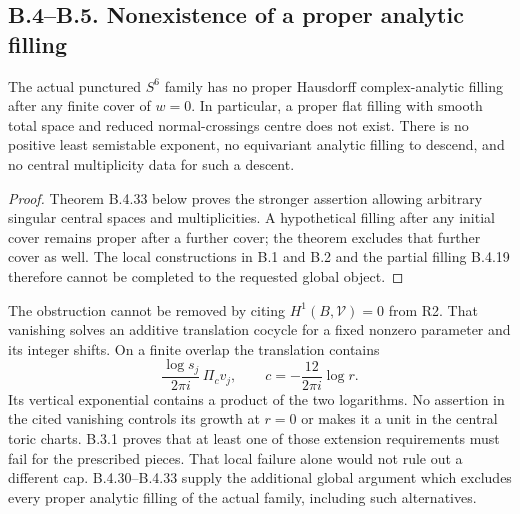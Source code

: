 

\subsection{B.4--B.5. Nonexistence of a proper analytic filling}

\begin{corollary}\label{push:B41}
The actual punctured $S^6$ family has no proper
Hausdorff complex-analytic filling after any finite
cover of $w=0$. In particular, a proper flat filling
with smooth total space and reduced normal-crossings
centre does not exist. There is no positive least
semistable exponent, no equivariant analytic filling
to descend, and no central multiplicity data for
such a descent.
\end{corollary}
\begin{proof}
Theorem B.4.33 below proves the stronger assertion
allowing arbitrary singular central spaces and
multiplicities. A hypothetical filling after any
initial cover remains proper after a further cover;
the theorem excludes that further cover as well.
The local constructions in B.1 and B.2 and the
partial filling B.4.19 therefore cannot be completed
to the requested global object.
\end{proof}

The obstruction cannot be removed by citing
$H^1(B,\mathcal V)=0$ from R2. That
vanishing solves an additive translation
cocycle for a fixed nonzero parameter and
its integer shifts. On a finite overlap
the translation contains
\[
 \frac{\log s_j}{2\pi i}\,\Pi_c v_j,
 \qquad c=-\frac{12}{2\pi i}\log r.
\]
Its vertical exponential contains a product
of the two logarithms. No assertion in
the cited vanishing controls its growth
at $r=0$ or makes it a unit in the central
toric charts. B.3.1 proves that at least
one of those extension requirements must
fail for the prescribed pieces. That local
failure alone would not rule out a different cap.
B.4.30--B.4.33 supply the additional global argument
which excludes every proper analytic filling of
the actual family, including such alternatives.

